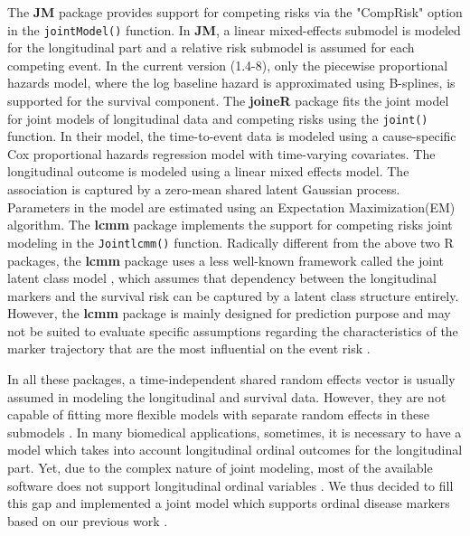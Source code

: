 The \textbf{JM} package provides support for competing risks via the "CompRisk" option in the \texttt{jointModel()} function.  In \textbf{JM}, a linear mixed-effects submodel is modeled for the longitudinal part and a relative risk submodel is assumed for each  competing event. In the current version (1.4-8), only the piecewise proportional hazards model, where the log baseline hazard is approximated using B-splines, is supported for the survival component.  The \textbf{joineR} package fits the joint model \citep{williamson2008joint} for joint models of longitudinal data and competing risks using the \texttt{joint()} function. In their model, the time-to-event data is modeled using a cause-specific Cox proportional hazards regression model with time-varying covariates. The longitudinal outcome is modeled using a linear mixed effects model. The association is captured by a zero-mean shared latent Gaussian process. Parameters in the model are estimated using an Expectation Maximization(EM) algorithm.  The \textbf{lcmm} package  implements the support for competing risks joint modeling in the \texttt{Jointlcmm()} function. Radically different from the above two R packages, the \textbf{lcmm} package  uses a less well-known framework called the joint latent class model \citep{proust2014joint}, which assumes that dependency between the longitudinal markers and the survival risk can be captured by a latent class structure entirely. However, the \textbf{lcmm} package is mainly designed for prediction purpose and may not be suited to evaluate specific assumptions regarding the characteristics of the marker trajectory that are the most influential on the event risk \citep{proust2014joint}.

In all these packages, a time-independent shared random effects vector is usually assumed in modeling the longitudinal and survival data. However, they are not capable of fitting more flexible models with separate random effects in these submodels \citep{elashoff2008joint,li2010joint}.  In many biomedical applications, sometimes, it is necessary to have a model which takes into account longitudinal ordinal outcomes for the longitudinal part. Yet, due to the complex nature of joint modeling, most of the available software does not support longitudinal ordinal variables \citep{armero2016bayesian, Ferrer2017phd}.   We thus decided to fill this gap and implemented a joint model which supports ordinal disease markers based on our previous work \citep{li2010joint}.

